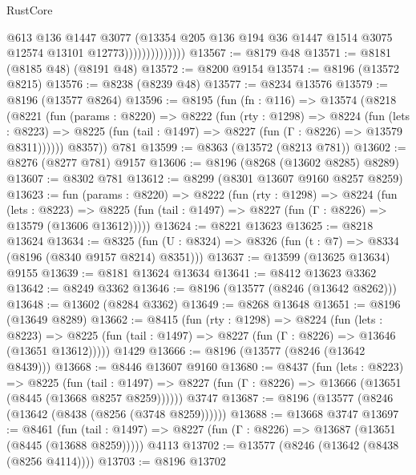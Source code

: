 \begin{lexlean}{RustCore}
\begin{coremodule}
                              @613
                              @136
                              @1447
                              @3077
                              (@13354
                                @205
                                @136
                                @194
                                @36
                                @1447
                                @1514
                                @3075
                                @12574
                                @13101
                                @12773))))))))))))))
@13567 := @8179 @48
@13571 := @8181 (@8185 @48) (@8191 @48)
@13572 := @8200 @9154
@13574 := @8196 (@13572 @8215)
@13576 := @8238 (@8239 @48)
@13577 := @8234 @13576
@13579 := @8196 (@13577 @8264)
@13596 := @8195
    (fun (fn : @116) =>
    @13574
      (@8218
        (@8221
          (fun (params : @8220) =>
          @8222
            (fun (rty : @1298) =>
            @8224
              (fun (lets : @8223) =>
              @8225 (fun (tail : @1497) => @8227 (fun (Γ : @8226) => @13579 @8311))))))
        @8357))
    @781
@13599 := @8363 (@13572 (@8213 @781))
@13602 := @8276 (@8277 @781) @9157
@13606 := @8196 (@8268 (@13602 @8285) @8289)
@13607 := @8302 @781
@13612 := @8299 (@8301 @13607 @9160 @8257 @8259)
@13623 := fun (params : @8220) =>
  @8222
    (fun (rty : @1298) =>
    @8224
      (fun (lets : @8223) =>
      @8225 (fun (tail : @1497) => @8227 (fun (Γ : @8226) => @13579 (@13606 @13612)))))
@13624 := @8221 @13623
@13625 := @8218 @13624
@13634 := @8325 (fun (U : @8324) => @8326 (fun (t : @7) => @8334 (@8196 (@8340 @9157 @8214) @8351)))
@13637 := @13599 (@13625 @13634) @9155
@13639 := @8181 @13624 @13634
@13641 := @8412 @13623 @3362
@13642 := @8249 @3362
@13646 := @8196 (@13577 (@8246 (@13642 @8262)))
@13648 := @13602 (@8284 @3362)
@13649 := @8268 @13648
@13651 := @8196 (@13649 @8289)
@13662 := @8415
    (fun (rty : @1298) =>
    @8224
      (fun (lets : @8223) =>
      @8225 (fun (tail : @1497) => @8227 (fun (Γ : @8226) => @13646 (@13651 @13612)))))
    @1429
@13666 := @8196 (@13577 (@8246 (@13642 @8439)))
@13668 := @8446 @13607 @9160
@13680 := @8437
    (fun (lets : @8223) =>
    @8225
      (fun (tail : @1497) =>
      @8227 (fun (Γ : @8226) => @13666 (@13651 (@8445 (@13668 @8257 @8259))))))
    @3747
@13687 := @8196 (@13577 (@8246 (@13642 (@8438 (@8256 (@3748 @8259))))))
@13688 := @13668 @3747
@13697 := @8461
    (fun (tail : @1497) => @8227 (fun (Γ : @8226) => @13687 (@13651 (@8445 (@13688 @8259)))))
    @4113
@13702 := @13577 (@8246 (@13642 (@8438 (@8256 @4114))))
@13703 := @8196 @13702

\end{coremodule}
\end{lexlean}
